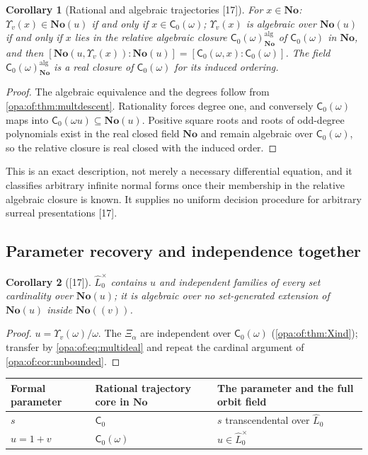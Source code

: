 \documentclass[11pt,oneside]{article}
\numberwithin{equation}{section}
\newtheorem{corollary}[corollary]{Corollary}
\theoremstyle{definition}
\theoremstyle{remark}
\newcommand{\No}{\mathbf{No}}
\newcommand{\src}[1]{\textup{\textsf{\small[#1]}}}
\begin{document}
\begin{corollary}[Rational and algebraic trajectories \src{17}]\label{opa:of:cor:multalg}
For $x\in\No$: $\Upsilon_v(x)\in\No(u)$ if and only if $x\in\mathsf C_0(\omega)$; $\Upsilon_v(x)$ is algebraic over $\No(u)$ if and only
if $x$ lies in the relative algebraic closure $\mathsf C_0(\omega)^{\mathrm{alg}}_{\No}$ of $\mathsf C_0(\omega)$ in $\No$, and then
$[\No(u,\Upsilon_v(x)):\No(u)]=[\mathsf C_0(\omega,x):\mathsf C_0(\omega)]$. The field $\mathsf C_0(\omega)^{\mathrm{alg}}_{\No}$ is a real closure
of $\mathsf C_0(\omega)$ for its induced ordering.
\end{corollary}
\begin{proof}
The algebraic equivalence and the degrees follow from \cref{opa:of:thm:multdescent}. Rationality forces degree one, and
conversely $\mathsf C_0(\omega)$ maps into $\mathsf C_0(\omega u)\subseteq\No(u)$. Positive square roots and roots of odd-degree
polynomials exist in the real closed field $\No$ and remain algebraic over $\mathsf C_0(\omega)$, so the relative closure is real
closed with the induced order.
\end{proof}

This is an exact description, not merely a necessary differential equation, and it classifies arbitrary infinite normal forms
once their membership in the relative algebraic closure is known. It supplies no uniform decision procedure for arbitrary
surreal presentations \src{17}.

\subsection{Parameter recovery and independence together}

\begin{corollary}[\src{17}]\label{opa:of:cor:multlarge}
$\widehat L^\times_0$ contains $u$ and independent families of every set cardinality over $\No(u)$; it is algebraic over no
set-generated extension of $\No(u)$ inside $\No((v))$.
\end{corollary}
\begin{proof}
$u=\Upsilon_v(\omega)/\omega$. The $\Xi_\alpha$ are independent over $\mathsf C_0(\omega)$ (\cref{opa:of:thm:Xind}); transfer by
\eqref{opa:of:eq:multideal} and repeat the cardinal argument of \cref{opa:of:cor:unbounded}.
\end{proof}

\begin{center}
\renewcommand{\arraystretch}{1.15}
\begin{tabular}{>{\raggedright\arraybackslash}p{}>{\raggedright\arraybackslash}p{}>{\raggedright\arraybackslash}p{}}
\toprule
Formal parameter & Rational trajectory core in $\No$ & The parameter and the full orbit field\\
\midrule
$s$ & $\mathsf C_0$ & $s$ transcendental over $\widehat L_0$\\
$u=1+v$ & $\mathsf C_0(\omega)$ & $u\in\widehat L^\times_0$\\
\bottomrule
\end{tabular}
\end{center}
\end{document}

